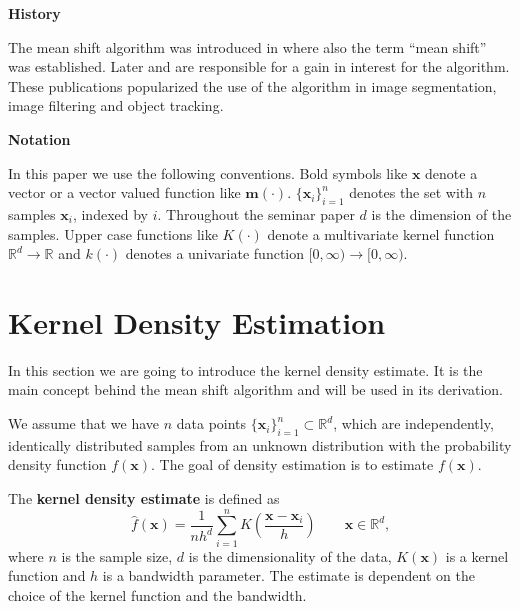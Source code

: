 \documentclass{article}
\begin{document}
\textbf{History}

The mean shift algorithm was introduced in \cite{Fukunaga.1975} where also the term ``mean shift'' was established. Later \cite{Comaniciu.2002} and \cite{Comaniciu.2003} are responsible for a gain in interest for the algorithm. These publications popularized the use of the algorithm in image segmentation, image filtering and  object tracking.


\textbf{Notation}

In this paper we use the following conventions. Bold symbols like $\bm{x}$ denote a vector or a vector valued function like $\bm{m}(\cdot)$. $\{ \bm{x}_i \}_{i=1}^n$ denotes the set with $n$ samples $\bm{x}_i$, indexed by $i$. Throughout the seminar paper $d$ is the dimension of the samples. Upper case functions like $K(\cdot)$ denote a multivariate kernel function $\mathbb{R}^d \rightarrow \mathbb{R}$ and $k(\cdot)$ denotes a univariate function $[0, \infty) \rightarrow [0, \infty)$.


\section{Kernel Density Estimation} \label{sec:kernel-density-estimation}

In this section we are going to introduce the kernel density estimate. It is the main concept behind the mean shift algorithm and will be used in its derivation.

We assume that we have $n$ data points $\{\bm{x}_i\}_{i=1}^n \subset \mathbb{R}^d$, which are independently, identically distributed samples from an unknown distribution with the probability density function $f(\bm{x})$. The goal of density estimation is to estimate $f(\bm{x})$.


The \textbf{kernel density estimate} is defined as
\begin{equation}
	\hat{f}(\bm{x}) = \frac{1}{nh^d} \sum_{i=1}^n K\left(\frac{\bm{x} - \bm{x}_i}{h} \right) \qquad \bm{x} \in \mathbb{R}^d\text{,}
	\label{eq:kernel-density-estimate}
\end{equation}
where $n$ is the sample size, $d$ is the dimensionality of the data, $K(\bm{x})$ is a kernel function and $h$ is a bandwidth parameter. The estimate is dependent on the choice of the kernel function and the bandwidth.
\end{document}
